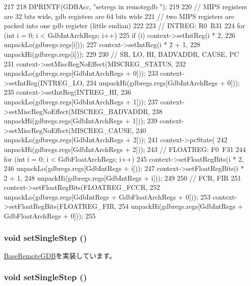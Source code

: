 \begin{DoxyCode}
217 {
218     DPRINTF(GDBAcc, "setregs in remotegdb \n");
219 
220     // MIPS registers are 32 bits wide, gdb registers are 64 bits wide
221     // two MIPS registers are packed into one gdb register (little endian)
222 
223     // INTREG: R0~R31
224     for (int i = 0; i < GdbIntArchRegs; i++) {
225         if (i) context->setIntReg(i * 2,
226                 unpackLo(gdbregs.regs[i]));
227         context->setIntReg(i * 2 + 1,
228                 unpackHi(gdbregs.regs[i]));
229     }
230     // SR, LO, HI, BADVADDR, CAUSE, PC
231     context->setMiscRegNoEffect(MISCREG_STATUS,
232                 unpackLo(gdbregs.regs[GdbIntArchRegs + 0]));
233     context->setIntReg(INTREG_LO,
234                 unpackHi(gdbregs.regs[GdbIntArchRegs + 0]));
235     context->setIntReg(INTREG_HI,
236                 unpackLo(gdbregs.regs[GdbIntArchRegs + 1]));
237     context->setMiscRegNoEffect(MISCREG_BADVADDR,
238                 unpackHi(gdbregs.regs[GdbIntArchRegs + 1]));
239     context->setMiscRegNoEffect(MISCREG_CAUSE,
240                 unpackLo(gdbregs.regs[GdbIntArchRegs + 2]));
241     context->pcState(
242                 unpackHi(gdbregs.regs[GdbIntArchRegs + 2]));
243     // FLOATREG: F0~F31
244     for (int i = 0; i < GdbFloatArchRegs; i++) {
245         context->setFloatRegBits(i * 2,
246                 unpackLo(gdbregs.regs[GdbIntRegs + i]));
247         context->setFloatRegBits(i * 2 + 1,
248                 unpackHi(gdbregs.regs[GdbIntRegs + i]));
249     }
250     // FCR, FIR
251     context->setFloatRegBits(FLOATREG_FCCR,
252                 unpackLo(gdbregs.regs[GdbIntRegs + GdbFloatArchRegs + 0]));
253     context->setFloatRegBits(FLOATREG_FIR,
254                 unpackHi(gdbregs.regs[GdbIntRegs + GdbFloatArchRegs + 0]));
255 }
\end{DoxyCode}
\hypertarget{classMipsISA_1_1RemoteGDB_a40d5da340fdb741de8cd3ffbc69708fe}{
\subsubsection[{setSingleStep}]{\setlength{\rightskip}{0pt plus 5cm}void setSingleStep ()}}
\label{classMipsISA_1_1RemoteGDB_a40d5da340fdb741de8cd3ffbc69708fe}


\hyperlink{classBaseRemoteGDB_a253d4b1107e84fe80036d1826067741a}{BaseRemoteGDB}を実装しています。\hypertarget{classMipsISA_1_1RemoteGDB_a40d5da340fdb741de8cd3ffbc69708fe}{
\subsubsection[{setSingleStep}]{\setlength{\rightskip}{0pt plus 5cm}void setSingleStep ()}}
\label{classMipsISA_1_1RemoteGDB_a40d5da340fdb741de8cd3ffbc69708fe}


